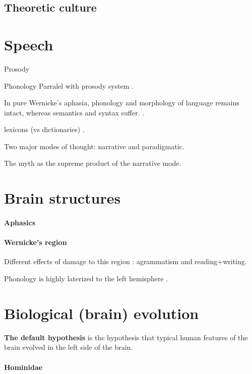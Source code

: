 \documentclass{article}
\begin{document}
\subsection{Theoretic culture}

\section{Speech}

Prosody

Phonology
Parralel with prosody system \citep[p.~249]{donald1991}.

In pure Wernicke's aphasia, phonology and morphology of language remains intact, whereas semantics and syntax suffer. \citep[p.~249]{donald1991}.

lexicons (vs dictionaries) \citep[fig.~7.1, p.~251]{donald1991}.

Two major modes of thought: narrative and paradigmatic.

The myth as the supreme product of the narrative mode.

\section{Brain structures}

\paragraph{Aphasics}

\paragraph{Wernicke's region}

Different effects of damage to this region \citep[p.~262]{donald1991}: agrammatism and reading+writing.

Phonology is highly laterized to the left hemisphere \citep[p.~262]{donald1991}.

\section{Biological (brain) evolution}
\label{sec:biological_evolution}

\textbf{The default hypothesis} is the hypothesis that typical human features
of the brain evolved in the left side of the brain.

\paragraph{Hominidae}
\end{document}
